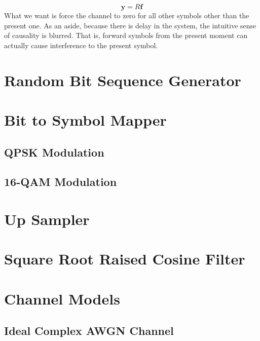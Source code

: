 \documentclass[]{article}
\begin{document}
\begin{equation}
\label{eq:equalizerMatrix}
\mathbf{y} = R\mathbf{f}
\end{equation}
What we want is force the channel to zero for all other symbols other than the present one.  As an aside, because there is delay in the system, the intuitive sense of causality is blurred. That is, forward symbols from the present moment can actually cause interference to the present symbol. 

\newpage
\section{Random Bit Sequence Generator}
\label{app:random_bit_generator}


\section{Bit to Symbol Mapper}
\label{app:bittosym}

\subsection{QPSK Modulation}
\label{app:qpsk_mod}


\subsection{16-QAM Modulation}
\label{app:qam_16_mod}


\section{Up Sampler}
\label{app:impulse_train}


\section{Square Root Raised Cosine Filter}
\label{app:sqrt_raised_cosine}


\section{Channel Models}
\subsection{Ideal Complex AWGN Channel}
\label{app:awgn_channel}

\end{document}
